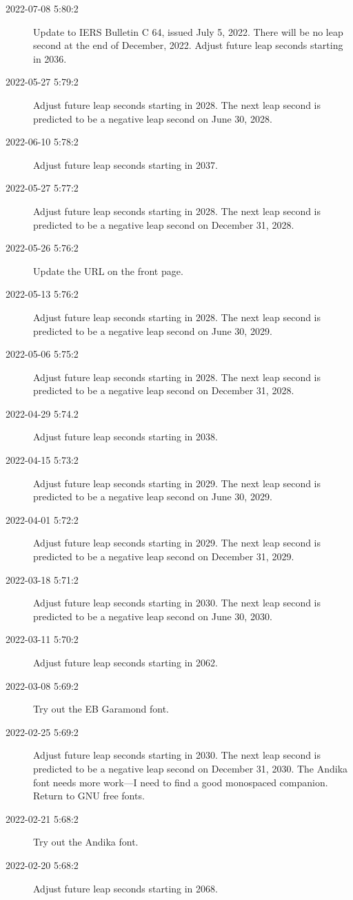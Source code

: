 \documentclass[letterpaper,twoside]{article}
\begin{document}
\begin{description}
\item[2022-07-08 5:80:2]Update to IERS Bulletin C 64,
  issued July 5, 2022.
  There will be no leap second at the end of December, 2022.
  Adjust future leap seconds starting in 2036.
\item[2022-05-27 5:79:2]Adjust future leap seconds starting in 2028.
  The next leap second is predicted to be a negative leap second
  on June 30, 2028.
\item[2022-06-10 5:78:2]Adjust future leap seconds starting in 2037.
\item[2022-05-27 5:77:2]Adjust future leap seconds starting in 2028.
  The next leap second is predicted to be a negative leap second
  on December 31, 2028.
\item[2022-05-26 5:76:2]Update the URL on the front page.
\item[2022-05-13 5:76:2]Adjust future leap seconds starting in 2028.
  The next leap second is predicted to be a negative leap second
  on June 30, 2029.
\item[2022-05-06 5:75:2]Adjust future leap seconds starting in 2028.
  The next leap second is predicted to be a negative leap second
  on December 31, 2028.
\item[2022-04-29 5:74.2]Adjust future leap seconds starting in 2038.
\item[2022-04-15 5:73:2]Adjust future leap seconds starting in 2029.
  The next leap second is predicted to be a negative leap second
  on June 30, 2029.
\item[2022-04-01 5:72:2]Adjust future leap seconds starting in 2029.
  The next leap second is predicted to be a negative leap second
  on December 31, 2029.
\item[2022-03-18 5:71:2]Adjust future leap seconds starting in 2030.
  The next leap second is predicted to be a negative leap second
  on June 30, 2030.
\item[2022-03-11 5:70:2]Adjust future leap seconds starting in 2062.
\item[2022-03-08 5:69:2]Try out the EB Garamond font.
\item[2022-02-25 5:69:2]Adjust future leap seconds starting in 2030.
  The next leap second is predicted to be a negative leap second
  on December 31, 2030.  The Andika font needs more work---I need to
  find a good monospaced companion.  Return to GNU free fonts.
\item[2022-02-21 5:68:2]Try out the Andika font.
\item[2022-02-20 5:68:2]Adjust future leap seconds starting in 2068.

\end{description}
\end{document}
